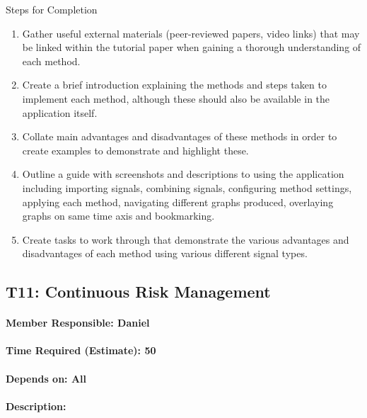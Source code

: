 \documentclass[
  paper=a4,
  ,captions=tableheading
]{scrartcl}
\begin{document}
Steps for Completion 
\begin{enumerate}
	\item Gather useful external materials (peer-reviewed papers, video links) that may be linked within the tutorial paper when gaining a thorough understanding of each method.
	\item Create a brief introduction explaining the methods and steps taken to implement each method, although these should also be available in the application itself.
	\item Collate main advantages and disadvantages of these methods in order to create examples to demonstrate and highlight these.
	\item Outline a guide with screenshots and descriptions to using the application including importing signals, combining signals, configuring method settings, applying each method, navigating different graphs produced, overlaying graphs on same time axis and bookmarking.
	\item Create tasks to work through that demonstrate the various advantages and disadvantages of each method using various different signal types.
\end{enumerate}

\newpage
\hypertarget{t11-continuous-risk-management}{%
\subsection{T11: Continuous Risk
Management}\label{t11-continuous-risk-management}}

\hypertarget{member-responsible-daniel}{%
\paragraph{Member Responsible: Daniel}\label{member-responsible-daniel}}

\hypertarget{time-required-estimate-50}{%
\paragraph{Time Required (Estimate):
50}\label{time-required-estimate-50}}

\hypertarget{depends-on-all-1}{%
\paragraph{Depends on: All}\label{depends-on-all-1}}

\hypertarget{description-9}{%
\paragraph{Description:}\label{description-9}}
\end{document}
